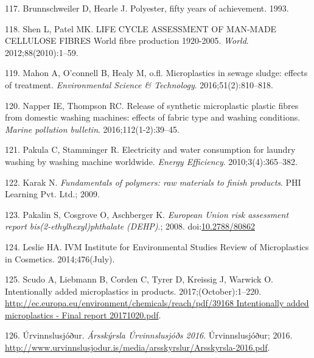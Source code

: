 \documentclass[icelandic,]{book}
\begin{document}
\leavevmode\hypertarget{ref-brunnschweiler1993polyester}{}%
117. Brunnschweiler D, Hearle J. Polyester, fifty years of achievement. 1993.

\leavevmode\hypertarget{ref-Shen2012}{}%
118. Shen L, Patel MK. LIFE CYCLE ASSESSMENT OF MAN-MADE CELLULOSE FIBRES World fibre production 1920-2005. \emph{World}. 2012;88(2010):1--59.

\leavevmode\hypertarget{ref-mahon2016microplastics}{}%
119. Mahon A, O'connell B, Healy M, o.fl. Microplastics in sewage sludge: effects of treatment. \emph{Environmental Science \& Technology}. 2016;51(2):810--818.

\leavevmode\hypertarget{ref-napper2016release}{}%
120. Napper IE, Thompson RC. Release of synthetic microplastic plastic fibres from domestic washing machines: effects of fabric type and washing conditions. \emph{Marine pollution bulletin}. 2016;112(1-2):39--45.

\leavevmode\hypertarget{ref-pakula2010electricity}{}%
121. Pakula C, Stamminger R. Electricity and water consumption for laundry washing by washing machine worldwide. \emph{Energy Efficiency}. 2010;3(4):365--382.

\leavevmode\hypertarget{ref-karak2009fundamentals}{}%
122. Karak N. \emph{Fundamentals of polymers: raw materials to finish products}. PHI Learning Pvt. Ltd.; 2009.

\leavevmode\hypertarget{ref-Pakalin2008}{}%
123. Pakalin S, Cosgrove O, Aschberger K. \emph{European Union risk assessment report bis(2-ethylhexyl)phthalate (DEHP)}.; 2008. doi:\href{https://doi.org/10.2788/80862}{10.2788/80862}

\leavevmode\hypertarget{ref-Leslie2014}{}%
124. Leslie HA. IVM Institute for Environmental Studies Review of Microplastics in Cosmetics. 2014;476(July).

\leavevmode\hypertarget{ref-Scudo2017}{}%
125. Scudo A, Liebmann B, Corden C, Tyrer D, Kreissig J, Warwick O. Intentionally added microplastics in products. 2017;(October):1--220. \href{http://ec.europa.eu/environment/chemicals/reach/pdf/39168\%20Intentionally\%20added\%20microplastics\%20-\%20Final\%20report\%2020171020.pdf}{http://ec.europa.eu/environment/chemicals/reach/pdf/39168 Intentionally added microplastics - Final report 20171020.pdf}.

\leavevmode\hypertarget{ref-Urvinnslusjouxf0ur2016}{}%
126. Úrvinnslusjóður. \emph{Ársskýrsla Úrvinnslusjóðs 2016}. Úrvinnslusjóður; 2016. \url{http://www.urvinnslusjodur.is/media/arsskyrslur/Arsskyrsla-2016.pdf}.
\end{document}

